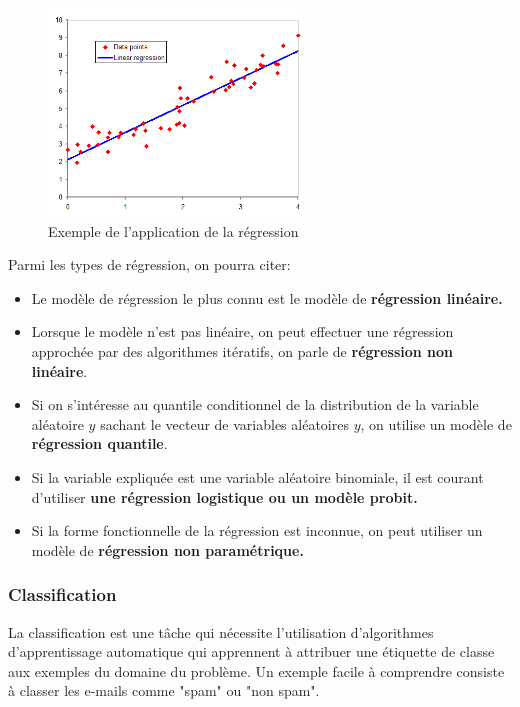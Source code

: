 \documentclass[a4paper,12pt]{report}
\begin{document}
 \begin{figure}[!ht]
 	\centering
 	\includegraphics[width=0.6\textwidth]{regression.png}
 	\caption{Exemple de l'application de la régression}
 	\label{fig:my_label}
 \end{figure}
Parmi les types de régression, on pourra citer:
\begin{itemize}
	\item Le modèle de régression le plus connu est le modèle de \textbf{régression linéaire.}
	\item Lorsque le modèle n'est pas linéaire, on peut effectuer une régression approchée par des algorithmes itératifs, on parle de \textbf{régression non linéaire}.
	\item Si on s'intéresse au quantile conditionnel de la distribution de la variable aléatoire $y$ sachant le vecteur de variables aléatoires $y$, on utilise un modèle de \textbf{régression quantile}.
	\item Si la variable expliquée est une variable aléatoire binomiale, il est courant d'utiliser \textbf{une régression logistique ou un modèle probit.}
	\item Si la forme fonctionnelle de la régression est inconnue, on peut utiliser un modèle de \textbf{régression non paramétrique.}
\end{itemize}
 
\subsubsection{Classification} 
La classification est une tâche qui nécessite l'utilisation d'algorithmes d'apprentissage automatique qui apprennent à attribuer une étiquette de classe aux exemples du domaine du problème. Un exemple facile à comprendre consiste à classer les e-mails comme "spam" ou "non spam".
\end{document}
